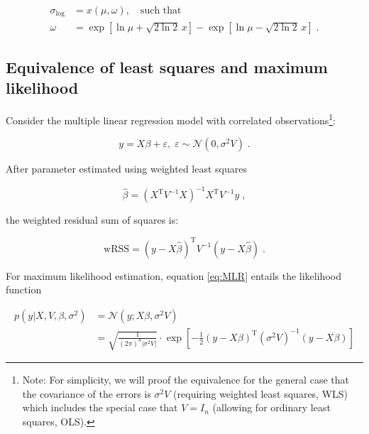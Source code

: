 \documentclass[a4paper,12pt]{article}
\begin{document}
\vspace{-0.5em}
\begin{equation} \label{eq:sig-log-fwhm}
\begin{split}
\sigma_\mathrm{log} &= x(\mu, \omega), \quad \text{such that} \\
\omega &= \exp \left[ \ln \mu + \sqrt{2 \ln 2} \, x \right] - \exp \left[ \ln \mu - \sqrt{2 \ln 2} \, x \right] \; .
\end{split}
\end{equation}


\pagebreak
\setcounter{equation}{0}
\subsection{Equivalence of least squares and maximum likelihood} \label{sec:App-B}

Consider the multiple linear regression model with correlated observations\footnote{Note: For simplicity, we will proof the equivalence for the general case that the covariance of the errors is $\sigma^2 V$ (requiring weighted least squares, WLS) which includes the special case that $V = I_n$ (allowing for ordinary least squares, OLS).}:

\begin{equation} \label{eq:MLR}
y = X \beta + \varepsilon, \; \varepsilon \sim \mathcal{N}(0, \sigma^2 V) \; .
\end{equation}

After parameter estimated using weighted least squares

\begin{equation} \label{eq:MLR-WLS}
\hat{\beta} = (X^\mathrm{T} V^{-1} X)^{-1} X^\mathrm{T} V^{-1} y \; ,
\end{equation}

the weighted residual sum of squares is:

\begin{equation} \label{eq:MLR-wRSS}
\mathrm{wRSS} = (y-X\hat{\beta})^\mathrm{T} V^{-1} (y-X\hat{\beta}) \; .
\end{equation}

For maximum likelihood estimation, equation \eqref{eq:MLR} entails the likelihood function

\vspace{-0.5em}
\begin{equation} \label{eq:MLR-LF}
\begin{split}
p(y|X,V,\beta,\sigma^2) &= \mathcal{N}(y; X\beta, \sigma^2 V) \\
&= \sqrt{\frac{1}{(2\pi)^n |\sigma^2 V|}} \cdot \exp\left[ -\frac{1}{2} (y - X\beta)^\mathrm{T} (\sigma^2 V)^{-1} (y - X\beta) \right]
\end{split}
\end{equation}
\end{document}

